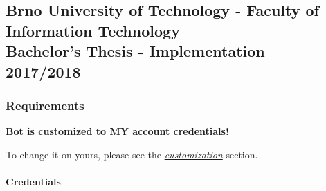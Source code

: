 \subsection{\texorpdfstring{Brno University of Technology - Faculty of
Information Technology\\
Bachelor's Thesis - Implementation\\
2017/2018}{Brno University of Technology - Faculty of Information Technology Bachelor's Thesis - Implementation 2017/2018}}\label{brno-university-of-technology---faculty-of-information-technology-bachelors-thesis---implementation-20172018}

\subsubsection{Requirements}\label{requirements}

\textbf{Bot is customized to MY account credentials!}

To change it on yours, please see the
\href{https://github.com/europ/VUTBR-FIT-BT-IMPL\#customization}{\emph{customization}}
section.

\paragraph{Credentials}\label{credentials}

